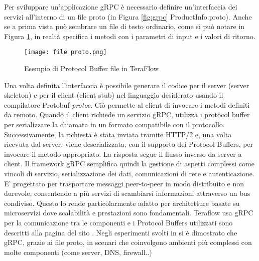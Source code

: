 \newline Per sviluppare un'applicazione gRPC è necessario definire un'interfaccia dei servizi %
all'interno di un file proto (in Figura \ref{fig:grpc} ProductInfo.proto).
Anche se a prima vista può sembrare un file di testo ordinario, come si può notare in Figura \ref{fig:proto}, in realtà specifica i metodi con i parametri di input e i valori di ritorno.
\begin{figure}[h]
    \centering
   \texttt{[image: file proto.png]}
    \caption{Esempio di Protocol Buffer file in TeraFlow \cite{ProtoBuf}}
    \label{fig:proto}
\end{figure}
\newline Una volta definita l'interfaccia è possibile generare il codice per il server (server skeleton) e per il client (client stub) nel linguaggio desiderato usando il compilatore Protobuf \textit{protoc}\cite{librogrpc}.
Ciò permette al client di invocare i metodi definiti da remoto.
\newline Quando il client richiede un servizio gRPC, utilizza i protocol buffer per serializzare la chiamata in un formato compatibile con il protocollo. 
Successivamente, la richiesta è stata inviata tramite HTTP/2 e, una volta ricevuta dal server, viene deserializzata, con il supporto dei Protocol Buffers, per invocare il metodo appropriato.
La risposta segue il flusso inverso da server a client\cite{librogrpc}.
\newline Il framework gRPC semplifica quindi la gestione di aspetti complessi come vincoli di servizio, serializzazione dei dati, comunicazioni di rete e autenticazione.
E' progettato per trasportare messaggi peer-to-peer in modo distribuito e non durevole, consentendo a più servizi di scambiarsi informazioni attraverso un bus condiviso.
Questo lo rende particolarmente adatto per architetture basate su microservizi dove scalabilità e prestazioni sono fondamentali.
Teraflow usa gRPC per la comunicazione tra le componenti e i Protocol Buffers utilizzati sono descritti alla pagina del sito \cite{ProtoBuf}.
\newline Negli esperimenti svolti in \cite{espgrpc} si è dimostrato che gRPC, grazie ai file proto, in scenari che coinvolgono ambienti più complessi con molte componenti (come server, DNS, firewall..)
